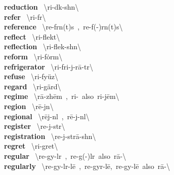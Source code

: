 \documentclass[10pt,a4paper]{article}
\begin{document}
\begin{multicols}{2}
\textbf{ reduction }\quad \ \textbackslash ri-\textprimstress d\textschwa k-sh\textschwa n\textbackslash \\
\textbf{ refer }\quad \ \textbackslash ri-\textprimstress f\textschwa r\textbackslash \\
\textbf{ reference }\quad \ \textbackslash \textprimstress re-f\textschwa rn(t)s\ ,\ \textprimstress re-f(\textschwa -)r\textschwa n(t)s\textbackslash \\
\textbf{ reflect }\quad \ \textbackslash ri-\textprimstress flekt\textbackslash \\
\textbf{ reflection }\quad \ \textbackslash ri-\textprimstress flek-sh\textschwa n\textbackslash \\
\textbf{ reform }\quad \ \textbackslash ri-\textprimstress f\.{o}rm\textbackslash \\
\textbf{ refrigerator }\quad \ \textbackslash ri-\textprimstress fri-j\textschwa -\textsecstress r\={a}-t\textschwa r\textbackslash \\
\textbf{ refuse }\quad \ \textbackslash ri-\textprimstress fy\"{u}z\textbackslash \\
\textbf{ regard }\quad \ \textbackslash ri-\textprimstress g\"{a}rd\textbackslash \\
\textbf{ regime }\quad \ \textbackslash r\={a}-\textprimstress zh\={e}m\ ,\ ri-\ also\ ri-\textprimstress j\={e}m\textbackslash \\
\textbf{ region }\quad \ \textbackslash \textprimstress r\={e}-j\textschwa n\textbackslash \\
\textbf{ regional }\quad \ \textbackslash \textprimstress r\={e}j-n\textschwa l\ ,\ \textprimstress r\={e}-j\textschwa -n\textsuperscript{\textreve}l\textbackslash \\
\textbf{ register }\quad \ \textbackslash \textprimstress re-j\textschwa -st\textschwa r\textbackslash \\
\textbf{ registration }\quad \ \textbackslash \textsecstress re-j\textschwa -\textprimstress str\={a}-sh\textschwa n\textbackslash \\
\textbf{ regret }\quad \ \textbackslash ri-\textprimstress gret\textbackslash \\
\textbf{ regular }\quad \ \textbackslash \textprimstress re-gy\textschwa -l\textschwa r\ ,\ \textprimstress re-g(\textschwa -)l\textschwa r\ also\ \textprimstress r\={a}-\textbackslash \\
\textbf{ regularly }\quad \ \textbackslash \textprimstress re-gy\textschwa -l\textschwa r-l\={e}\ ,\ \textprimstress re-gy\textschwa r-l\={e},\ \textprimstress re-gy\textschwa -l\={e}\ also\ \textprimstress r\={a}-\textbackslash \\

\end{multicols}
\end{document}

